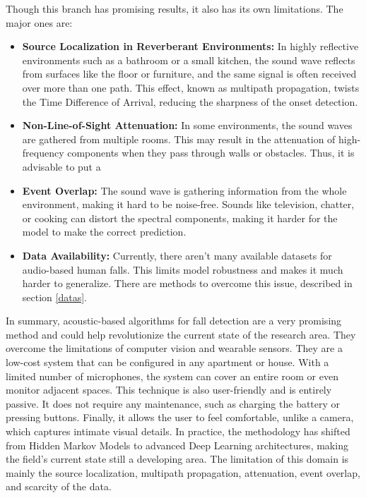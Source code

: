 \documentclass[11pt, a4paper, twoside]{article}
\begin{document}
Though this branch has promising results, it also has its own limitations. The major ones are: 
\begin{itemize}
    \item \textbf{Source Localization in Reverberant Environments:} In highly reflective environments such as a bathroom or a small kitchen, the sound wave reflects from surfaces like the floor or furniture, and the same signal is often received over more than one path. This effect, known as multipath propagation, twists the Time Difference of Arrival, reducing the sharpness of the onset detection.
    \item \textbf{Non-Line-of-Sight Attenuation:} In some environments, the sound waves are gathered from multiple rooms. This may result in the attenuation of high-frequency components when they pass through walls or obstacles. Thus, it is advisable to put a 
    \item \textbf{Event Overlap:} The sound wave is gathering information from the whole environment, making it hard to be noise-free. Sounds like television, chatter, or cooking can distort the spectral components, making it harder for the model to make the correct prediction.
    \item \textbf{Data Availability:} Currently, there aren't many available datasets for audio-based human falls. This limits model robustness and makes it much harder to generalize. There are methods to overcome this issue, described in section \ref{datas}.
\end{itemize}

In summary, acoustic-based algorithms for fall detection are a very promising method and could help revolutionize the current state of the research area. They overcome the limitations of computer vision and wearable sensors. They are a low-cost system that can be configured in any apartment or house. With a limited number of microphones, the system can cover an entire room or even monitor adjacent spaces. This technique is also user-friendly and is entirely passive. It does not require any maintenance, such as charging the battery or pressing buttons. Finally, it allows the user to feel comfortable, unlike a camera, which captures intimate visual details. In practice, the methodology has shifted from Hidden Markov Models to advanced Deep Learning architectures, making the field's current state still a developing area. The limitation of this domain is mainly the source localization, multipath propagation, attenuation, event overlap, and scarcity of the data. 
\end{document}
